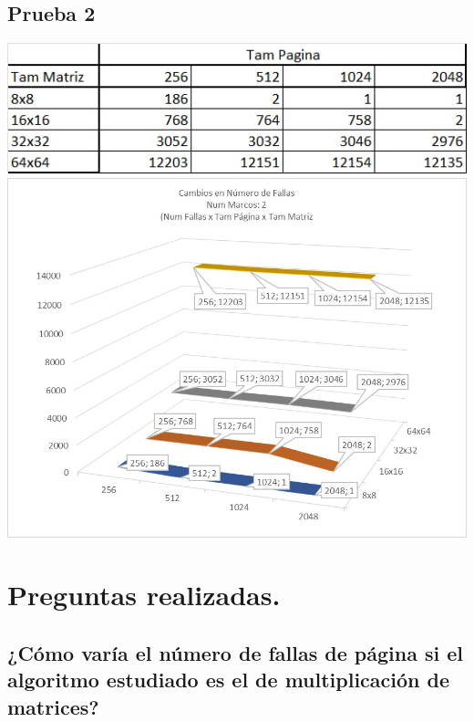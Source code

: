 \documentclass[a4paper]{article}
\begin{document}
\subsection{Prueba 2}
\includegraphics{2-1.jpeg}
\includegraphics[scale=0.55]{2-2.jpeg}


\section{Preguntas realizadas.}
\subsection{¿Cómo varía el número de fallas de página si el algoritmo 
estudiado es el de multiplicación de matrices?}
\end{document}
